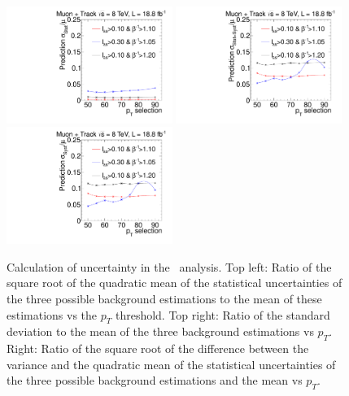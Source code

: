 \begin{figure}
\begin{center}
\includegraphics[clip=false, trim=0.0cm 0cm 0.0cm 0cm, width=0.48\textwidth]{figures/tkmu/Systematics_Data8TeV_pT_Stat}
\includegraphics[clip=false, trim=0.0cm 0cm 0.0cm 0cm, width=0.48\textwidth]{figures/tkmu/Systematics_Data8TeV_pT_Sum} \\
\includegraphics[clip=false, trim=0.0cm 0cm 0.0cm 0cm, width=0.48\textwidth]{figures/tkmu/Systematics_Data8TeV_pT_Syst}
\caption[Statistical and systematic uncertainty in the background prediction for different sets of thresholds in the \tktof\ analysis.]
{Calculation of uncertainty in the \tktof\ analysis.
Top left: Ratio of the square root of the quadratic
mean of the statistical uncertainties of the three possible background
estimations to the mean of these estimations vs
the $p_T$ threshold. Top right: Ratio of the standard deviation to the mean of the three
background estimations vs $p_T$. Right: Ratio of the
square root of the difference between the variance and the quadratic
mean of the statistical uncertainties  of the three possible background
estimations and the mean vs $p_T$.
}
\label{fig:TkMuUnc}
\end{center}
\end{figure}

